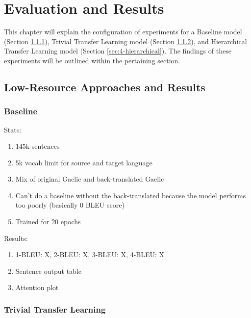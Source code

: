 
\chapter{Evaluation and Results}
This chapter will explain the configuration of experiments for a Baseline model (Section \ref{sec:4-baseline}), Trivial Transfer Learning model (Section \ref{sec:4-trivial}), and Hierarchical Transfer Learning model (Section \ref{sec:4-hierarchical}). The findings of these experiments will be outlined within the pertaining section.
\newpage
\section{Low-Resource Approaches and Results}


\subsection{Baseline}
\label{sec:4-baseline}
Stats:
\begin{enumerate}
    \item 145k sentences
    \item 5k vocab limit for source and target language
    \item Mix of original Gaelic and back-translated Gaelic
    \item Can't do a baseline without the back-translated because the model performs too poorly (basically 0 BLEU score)
    \item Trained for 20 epochs
\end{enumerate}

Results:
\begin{enumerate}
    \item 1-BLEU: X, 2-BLEU: X, 3-BLEU: X, 4-BLEU: X
    \item Sentence output table
    \item Attention plot
\end{enumerate}


\subsection{Trivial Transfer Learning}
\label{sec:4-trivial}

